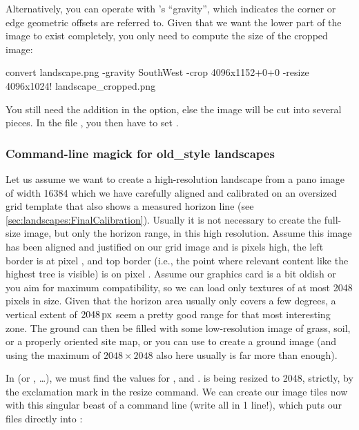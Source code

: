 Alternatively, you can operate with 's ``gravity'', which indicates
the corner or edge geometric offsets are referred to. Given that we
want the lower part of the image to exist completely, you only need to
compute the size of the cropped image:

\begin{commands}
convert landscape.png -gravity SouthWest -crop 4096x1152+0+0
        -resize 4096x1024! landscape_cropped.png
\end{commands}

\noindent You still need the addition  in the  option,
else the image will be cut into several pieces.  In the file
, you then have to set .


\subsubsection{Command-line magick for old\_style landscapes}
\label{sec:landscapes:ImageMagic:oldstyle}


Let us assume we want to create a high-resolution landscape from a
pano image of width 16384 which we have carefully aligned and
calibrated on an oversized grid template that also shows a measured
horizon line (see \ref{sec:landscapes:FinalCalibration}). Usually it
is not necessary to create the full-size image, but only the horizon
range, in this high resolution. Assume this image has been aligned and
justified on our grid image and is  pixels high, the left
border is at pixel , and top border (i.e., the point
where relevant content like the highest tree is visible) is on pixel
. Assume our graphics card is a bit oldish or you aim for
maximum compatibility, so we can load only textures of at most 2048
pixels in size. Given that the horizon area usually only covers a few
degrees, a vertical extent of $2048\,\mathrm{px}$ seem a pretty good range for
that most interesting zone. The ground can then be filled with some
low-resolution image of grass, soil, or a properly oriented site map,
or you can use  to create a ground image (and using the
maximum of $2048\times2048$ also here usually is far more than
enough).

In  (or , \ldots), we must find the values for
,  and .  is being
resized to 2048, strictly, by the exclamation mark in the resize
command.  We can create our image tiles now with this singular beast
of a command line (write all in 1 line!), which puts our files directly into
:

